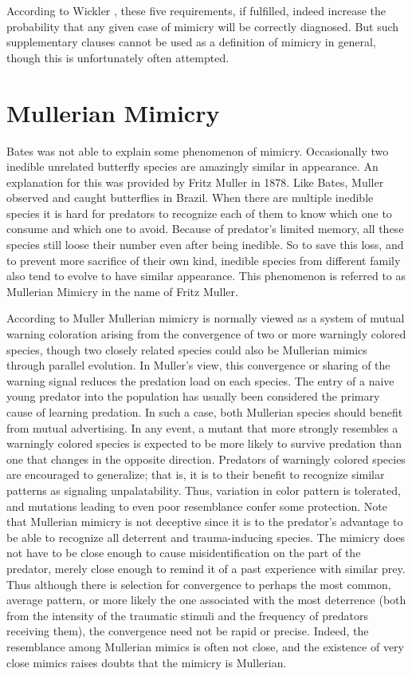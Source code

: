 According to Wickler \cite{wickler1986}, these five requirements, if fulfilled, indeed increase the probability that any given case of mimicry will be correctly diagnosed. But such supplementary clauses cannot be used as a definition of mimicry in general, though this is unfortunately often attempted. 

\section{Mullerian Mimicry}
Bates was not able to explain some phenomenon of mimicry. Occasionally two inedible unrelated butterfly species are amazingly similar in appearance. An explanation for this was provided by Fritz Muller in 1878. Like Bates, Muller observed and caught butterflies in Brazil. When there are multiple inedible species it is hard for predators to recognize each of them to know which one to consume and which one to avoid. Because of predator's limited memory, all these species still loose their number even after being inedible. So to save this loss, and to prevent more sacrifice of their own kind, inedible species from different family also tend to evolve to have similar appearance. This phenomenon is referred to as Mullerian Mimicry in the name of Fritz Muller.

According to Muller \cite{muller1879} Mullerian mimicry is normally viewed as a system of mutual warning coloration arising from the convergence of two or more warningly colored species, though two closely related species could also be Mullerian mimics through parallel evolution. In Muller's view, this convergence or sharing of the warning signal reduces the predation load on each species. The entry of a naive young predator into the population has usually been considered the primary cause of learning predation.  In such a case, both Mullerian species should benefit from mutual advertising. In any event, a mutant that more strongly resembles a warningly colored species is expected to be more likely to survive predation than one that changes in the opposite direction. Predators of warningly colored species are encouraged to generalize; that is, it is to their benefit to recognize similar patterns as signaling unpalatability. Thus, variation in color pattern is tolerated, and mutations leading to even poor resemblance confer some protection. Note that Mullerian mimicry is not deceptive since it is to the predator's advantage to be able to recognize all deterrent and trauma-inducing species. The mimicry does not have to be close enough to cause misidentification on the part of the predator, merely close enough to remind it of a past experience with similar prey.  Thus although there is selection for convergence to perhaps the most common, average pattern, or more likely the one associated with the most deterrence (both from the intensity of the traumatic stimuli and the frequency of predators receiving them), the convergence need not be rapid or precise. Indeed, the resemblance among Mullerian mimics is often not close, and the existence of very close mimics raises doubts that the mimicry is Mullerian. 

